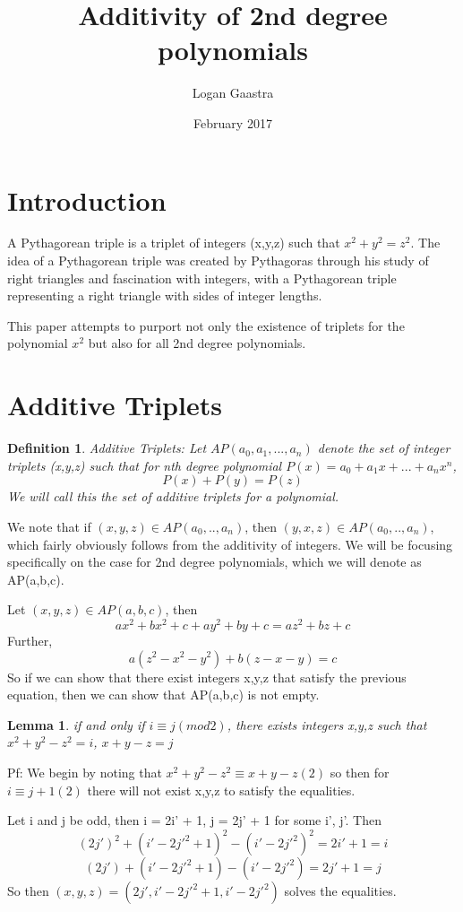 \documentclass{article}
\title{Additivity of 2nd degree polynomials}
\author{Logan Gaastra }
\date{February 2017}
\newtheorem*{definition}{Definition}
\newtheorem{lemma}{Lemma}
\begin{document}
\maketitle

\section{Introduction}
A Pythagorean triple is a triplet of integers (x,y,z) such that $ x^2+y^2=z^2 $. The idea of a Pythagorean triple was created by Pythagoras through his study of right triangles and fascination with integers, with a Pythagorean triple representing a right triangle with sides of integer lengths.

This paper attempts to purport not only the existence of triplets for the polynomial $x^2$ but also for all 2nd degree polynomials.
\section{Additive Triplets}
\begin{definition}{Additive Triplets:}
Let $AP(a_0,a_1,...,a_n)$ denote the set of integer triplets (x,y,z) such that for nth degree polynomial 
$P(x) = a_0 + a_1x+...+a_nx^n$, $$P(x) + P(y) = P(z)$$
We will call this the set of additive triplets for a polynomial.
\end{definition}
 We note that if $(x,y,z) \in  AP(a_0,..,a_n) $, then $(y,x,z) \in AP(a_0,..,a_n) $, which fairly obviously follows from the additivity of integers. We will be focusing specifically on the case for 2nd degree polynomials, which we will denote as AP(a,b,c).

Let $(x,y,z) \in  AP(a,b,c) $, then $$ax^2+bx^2+c+ay^2+by+c=az^2+bz+c$$ Further, $$a(z^2-x^2-y^2)+b(z-x-y)=c$$ So if we can show that there exist integers x,y,z that satisfy the previous equation, then we can show that AP(a,b,c) is not empty.

\begin{lemma}
if and only if $i \equiv j(mod  2)$, there exists integers x,y,z such that $x^2+y^2-z^2 = i$, $x+y-z=j$
\end{lemma}

Pf: We begin by noting that $x^2+y^2-z^2\equiv x+y-z(2)$ so then for $i\equiv j+1(2)$ there will not exist x,y,z to satisfy the equalities.

Let i and j be odd, then i = 2i' + 1, j = 2j' + 1 for some i', j'. Then
$$(2j')^2+(i'-2j'^2+1)^2-(i'-2j'^2)^2= 2i'+1 = i$$ $$(2j')+(i'-2j'^2+1)-(i'-2j'^2) = 2j'+1 = j$$
So then $(x,y,z)=(2j',i'-2j'^2+1,i'-2j'^2)$ solves the equalities.
\end{document}
